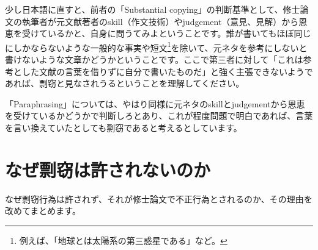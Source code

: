 少し日本語に直すと、前者の「Substantial copying」の判断基準として、修士論文の執筆者が元文献著者のskill（作文技術）やjudgement（意見、見解）から恩恵を受けているかと、自身に問うてみよということです。誰が書いてもほぼ同じにしかならないような一般的な事実や短文\footnote{例えば、「地球とは太陽系の第三惑星である」など。}を除いて、元ネタを参考にしないと書けないような文章かどうかということです。ここで第三者に対して「これは参考とした文献の言葉を借りずに自分で書いたものだ」と強く主張できないようであれば、剽窃と見なされうるということを理解してください。

「Paraphrasing」については、やはり同様に元ネタのskillとjudgementから恩恵を受けているかどうかで判断しろとあり、これが程度問題で明白であれば、言葉を言い換えていたとしても剽窃であると考えるとしています。

\section{なぜ剽窃は許されないのか}

なぜ剽窃行為は許されず、それが修士論文で不正行為とされるのか、その理由を改めてまとめます。

